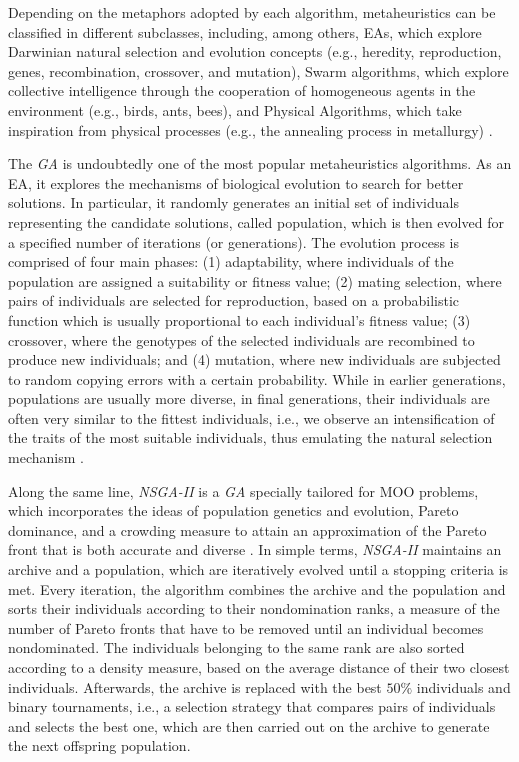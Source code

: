 	Depending on the metaphors adopted by each algorithm, metaheuristics can be classified in different subclasses, including, among others, \acp{EA}, which explore Darwinian natural selection and evolution concepts (e.g., heredity, reproduction, genes, recombination, crossover, and mutation), Swarm algorithms, which explore collective intelligence through the cooperation of homogeneous agents in the environment (e.g., birds, ants, bees), and Physical Algorithms, which take inspiration from physical processes (e.g., the annealing process in metallurgy) \cite{Brownlee2011}.
	
	The \textit{\ac{GA}} is undoubtedly one of the most popular metaheuristics algorithms. As an \ac{EA}, it explores the mechanisms of biological evolution to search for better solutions. In particular, it randomly generates an initial set of individuals representing the candidate solutions, called population, which is then evolved for a specified number of iterations (or generations). The evolution process is comprised of four main phases: (1) adaptability, where individuals of the population are assigned a suitability or fitness value; (2) mating selection, where pairs of individuals are selected for reproduction, based on a probabilistic function which is usually proportional to each individual's fitness value; (3) crossover, where the genotypes of the selected individuals are recombined to produce new individuals; and (4) mutation, where new individuals are subjected to random copying errors with a certain probability. While in earlier generations, populations are usually more diverse, in final generations, their individuals are often very similar to the fittest individuals, i.e., we observe an intensification of the traits of the most suitable individuals, thus emulating the natural selection mechanism \cite{Brownlee2011}. %
	
	Along the same line, \textit{\ac{NSGA-II}} is a \textit{\ac{GA}} specially tailored for \ac{MOO} problems, which incorporates the ideas of population genetics and evolution, Pareto dominance, and a crowding measure to attain an approximation of the Pareto front that is both accurate and diverse \cite{Deb2002}. In simple terms, \textit{\ac{NSGA-II}} maintains an archive and a population, which are iteratively evolved until a stopping criteria is met. Every iteration, the algorithm combines the archive and the population and sorts their individuals according to their nondomination ranks, a measure of the number of Pareto fronts that have to be removed until an individual becomes nondominated. The individuals belonging to the same rank are also sorted according to a density measure, based on the average distance of their two closest individuals. Afterwards, the archive is replaced with the best $50\%$ individuals and binary tournaments, i.e., a selection strategy that compares pairs of individuals and selects the best one, which are then carried out on the archive to generate the next offspring population. 

